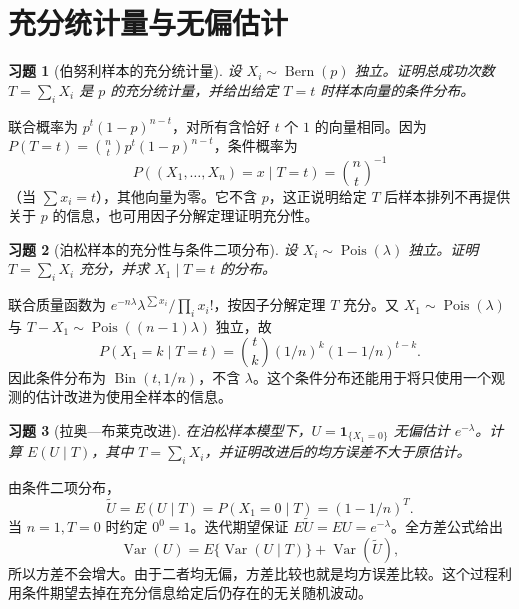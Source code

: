 \documentclass[12pt,fontset=fandol]{ctexart}
\newtheorem{exercise}{习题}[section]
\begin{document}
\clearpage\section{充分统计量与无偏估计}

\begin{exercise}[伯努利样本的充分统计量]\label{q:B11.1}
设 $X_i\sim\operatorname{Bern}(p)$ 独立。证明总成功次数 $T=\sum_iX_i$ 是 $p$ 的充分统计量，并给出给定 $T=t$ 时样本向量的条件分布。\par{}
\end{exercise}

\begin{solve}\label{a:B11.1}联合概率为 $p^t(1-p)^{n-t}$，对所有含恰好 $t$ 个 $1$ 的向量相同。因为 $P(T=t)=\binom nt p^t(1-p)^{n-t}$，条件概率为\[P((X_1,\ldots,X_n)=x\mid T=t)=\binom nt^{-1}\]（当 $\sum x_i=t$），其他向量为零。它不含 $p$，这正说明给定 $T$ 后样本排列不再提供关于 $p$ 的信息，也可用因子分解定理证明充分性。\end{solve}

\begin{exercise}[泊松样本的充分性与条件二项分布]\label{q:B11.2}
设 $X_i\sim\operatorname{Pois}(\lambda)$ 独立。证明 $T=\sum_iX_i$ 充分，并求 $X_1\mid T=t$ 的分布。\par{}
\end{exercise}

\begin{solve}\label{a:B11.2}联合质量函数为 $e^{-n\lambda}\lambda^{\sum x_i}/\prod_i x_i!$，按因子分解定理 $T$ 充分。又 $X_1\sim\operatorname{Pois}(\lambda)$ 与 $T-X_1\sim\operatorname{Pois}((n-1)\lambda)$ 独立，故\[P(X_1=k\mid T=t)=\binom tk(1/n)^k(1-1/n)^{t-k}.\]因此条件分布为 $\operatorname{Bin}(t,1/n)$，不含 $\lambda$。这个条件分布还能用于将只使用一个观测的估计改进为使用全样本的信息。\end{solve}

\begin{exercise}[拉奥—布莱克改进]\label{q:B11.3}
在泊松样本模型下，$U=\mathbf1_{\{X_1=0\}}$ 无偏估计 $e^{-\lambda}$。计算 $E(U\mid T)$，其中 $T=\sum_iX_i$，并证明改进后的均方误差不大于原估计。\par{}
\end{exercise}

\begin{solve}\label{a:B11.3}由条件二项分布，\[\widetilde U=E(U\mid T)=P(X_1=0\mid T)=(1-1/n)^T.\]当 $n=1,T=0$ 时约定 $0^0=1$。迭代期望保证 $E\widetilde U=EU=e^{-\lambda}$。全方差公式给出\[\operatorname{Var}(U)=E\{\operatorname{Var}(U\mid T)\}+\operatorname{Var}(\widetilde U),\]所以方差不会增大。由于二者均无偏，方差比较也就是均方误差比较。这个过程利用条件期望去掉在充分信息给定后仍存在的无关随机波动。\end{solve}
\end{document}
